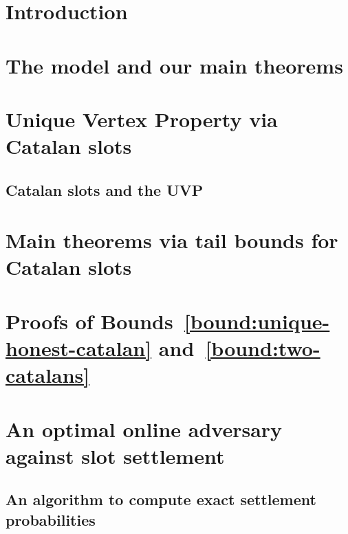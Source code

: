 \documentclass{article}
\theoremstyle{definition}
\begin{document}

\section{Introduction}


\section{The model and our main theorems}\label{sec:model}


\section{Unique Vertex Property via Catalan slots}\label{sec:definitions}


\subsection{Catalan slots and the UVP}\label{sec:catalan}



\section{Main theorems via tail bounds for Catalan slots}\label{sec:bounds-main-proofs}


\section{Proofs of Bounds~\ref{bound:unique-honest-catalan} and~\ref{bound:two-catalans}}\label{sec:estimates}


\section{An optimal online adversary against slot settlement}
\label{sec:recursion}

\subsection{An algorithm to compute exact settlement probabilities}
\label{sec:exact-prob}

\end{document}
